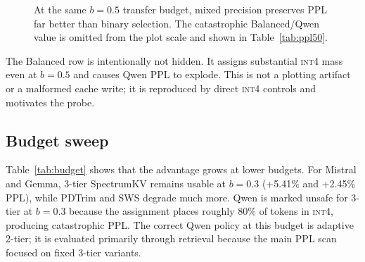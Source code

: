 \documentclass[11pt]{article}
\newcommand{\method}{SpectrumKV}
\newcommand{\budget}{b}
\newcommand{\pct}{\%}
\newcommand{\intiv}{\textsc{int4}}
\theoremstyle{plain}
\theoremstyle{definition}
\begin{document}
\begin{figure}[t]
\centering
{}
\caption{At the same $\budget=0.5$ transfer budget, mixed precision preserves PPL far better than binary selection.  The catastrophic Balanced/Qwen value is omitted from the plot scale and shown in Table~\ref{tab:ppl50}.}
\label{fig:ppl50}
\end{figure}

The Balanced row is intentionally not hidden.  It assigns substantial \intiv{} mass even at $\budget=0.5$ and causes Qwen PPL to explode.  This is not a plotting artifact or a malformed cache write; it is reproduced by direct \intiv{} controls and motivates the probe.

\subsection{Budget sweep}
\label{sec:rq8}

Table~\ref{tab:budget} shows that the advantage grows at lower budgets.  For Mistral and Gemma, 3-tier \method{} remains usable at $\budget=0.3$ (+5.41\pct{} and +2.45\pct{} PPL), while PDTrim and SWS degrade much more.  Qwen is marked unsafe for 3-tier at $\budget=0.3$ because the assignment places roughly 80\pct{} of tokens in \intiv{}, producing catastrophic PPL.  The correct Qwen policy at this budget is adaptive 2-tier; it is evaluated primarily through retrieval because the main PPL scan focused on fixed 3-tier variants.
\end{document}
